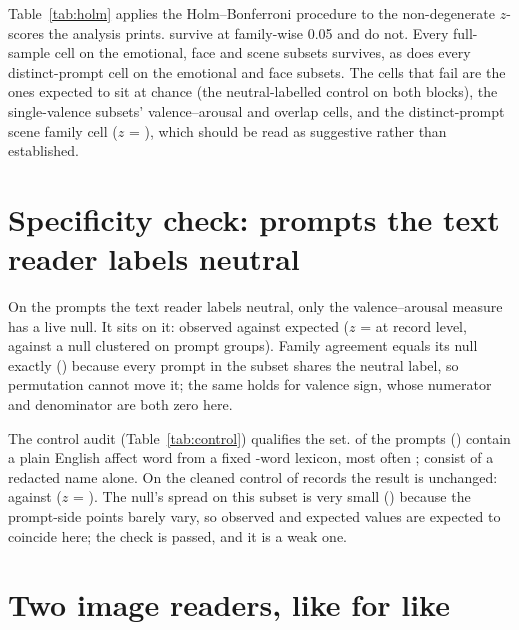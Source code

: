 Table~\ref{tab:holm} applies the Holm--Bonferroni procedure to the \HolmM{} non-degenerate $z$-scores the analysis prints. \HolmSurvive{} survive at family-wise 0.05 and \HolmFail{} do not. Every full-sample cell on the emotional, face and scene subsets survives, as does every distinct-prompt cell on the emotional and face subsets. The cells that fail are the ones expected to sit at chance (the neutral-labelled control on both blocks), the single-valence subsets' valence--arousal and overlap cells, and the distinct-prompt scene family cell ($z$ = \DistSceneFamZ{}), which should be read as suggestive rather than established.




\section{Specificity check: prompts the text reader labels neutral}
\label{sec:results-control}

On the \CtrlN{} prompts the text reader labels neutral, only the valence--arousal measure has a live null. It sits on it: \CtrlVaObs{} observed against \CtrlVaNull{} expected ($z$ = \CtrlVaZ{} at record level, \CtrlVaZClustered{} against a null clustered on prompt groups). Family agreement equals its null exactly (\CtrlFamObs{}) because every prompt in the subset shares the neutral label, so permutation cannot move it; the same holds for valence sign, whose numerator and denominator are both zero here.

The control audit (Table~\ref{tab:control}) qualifies the set. \CtrlFlagged{} of the \CtrlN{} prompts (\CtrlFlaggedPct{}) contain a plain English affect word from a fixed \CtrlLexicon{}-word lexicon, most often \CtrlTopWords{}; \CtrlNameOnly{} consist of a redacted name alone. On the cleaned control of \CtrlCleanN{} records the result is unchanged: \CtrlCleanVaObs{} against \CtrlCleanVaNull{} ($z$ = \CtrlCleanVaZ{}). The null's spread on this subset is very small (\CtrlVaSd{}) because the prompt-side points barely vary, so observed and expected values are expected to coincide here; the check is passed, and it is a weak one.



\section{Two image readers, like for like}
\label{sec:results-method}

